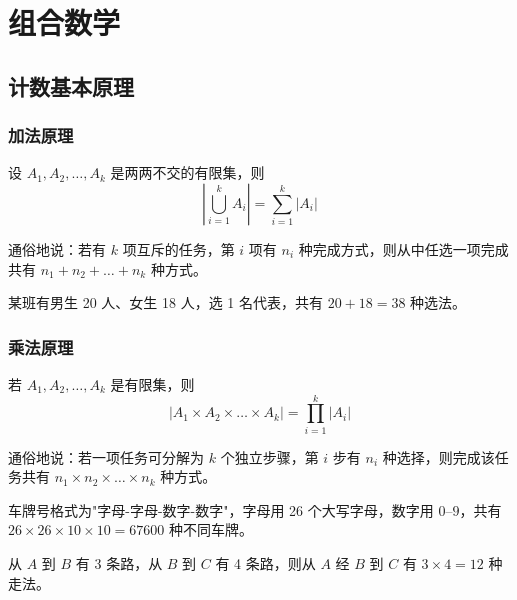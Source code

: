 \chapter{组合数学}

\section{计数基本原理}

\subsection{加法原理}

\begin{mydefinition}{}
设 $A_1, A_2, \dots, A_k$ 是两两不交的有限集，则
\[
\left|\bigcup_{i=1}^{k} A_i\right| = \sum_{i=1}^{k} |A_i|
\]
\end{mydefinition}

通俗地说：若有 $k$ 项互斥的任务，第 $i$ 项有 $n_i$ 种完成方式，则从中任选一项完成共有 $n_1 + n_2 + \dots + n_k$ 种方式。

\begin{example}
某班有男生 20 人、女生 18 人，选 1 名代表，共有 $20 + 18 = 38$ 种选法。
\end{example}

\subsection{乘法原理}

\begin{mydefinition}{}
若 $A_1, A_2, \dots, A_k$ 是有限集，则
\[
|A_1 \times A_2 \times \dots \times A_k| = \prod_{i=1}^{k} |A_i|
\]
\end{mydefinition}

通俗地说：若一项任务可分解为 $k$ 个独立步骤，第 $i$ 步有 $n_i$ 种选择，则完成该任务共有 $n_1 \times n_2 \times \dots \times n_k$ 种方式。

\begin{example}
车牌号格式为"字母-字母-数字-数字"，字母用 26 个大写字母，数字用 $0$--$9$，共有 $26 \times 26 \times 10 \times 10 = 67600$ 种不同车牌。
\end{example}

\begin{example}
从 $A$ 到 $B$ 有 3 条路，从 $B$ 到 $C$ 有 4 条路，则从 $A$ 经 $B$ 到 $C$ 有 $3 \times 4 = 12$ 种走法。
\end{example}

